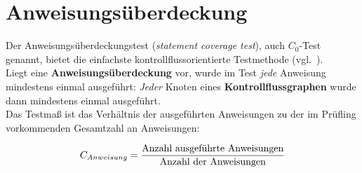 \usepackage{lstmisc}\section{Anweisungsüberdeckung}

\begin{tcolorbox}[title=Anweisungsüberdeckung ($C_0$-Test)]

    Der Anweisungsüberdeckungstest (\textit{statement coverage test}), auch $C_0$-Test genannt, bietet die einfachste kontrollflussorientierte Testmethode (vgl.~\cite[85]{Lig09a}).\\

    \noindent
    Liegt eine \textbf{Anweisungsüberdeckung} vor, wurde im Test \textit{jede} Anweisung mindestens einmal ausgeführt: \textit{Jeder} Knoten eines \textbf{Kontrollflussgraphen} wurde dann mindestens einmal ausgeführt.\\

    \noindent
    Das Testmaß ist das Verhältnis der ausgeführten Anweisungen zu der im Prüfling vorkommenden Gesamtzahl an Anweisungen:

    \begin{equation}\notag
        C_{Anweisung} = \frac{\text{Anzahl ausgeführte Anweisungen}}{\text{Anzahl der Anweisungen}}
    \end{equation}


\end{tcolorbox}